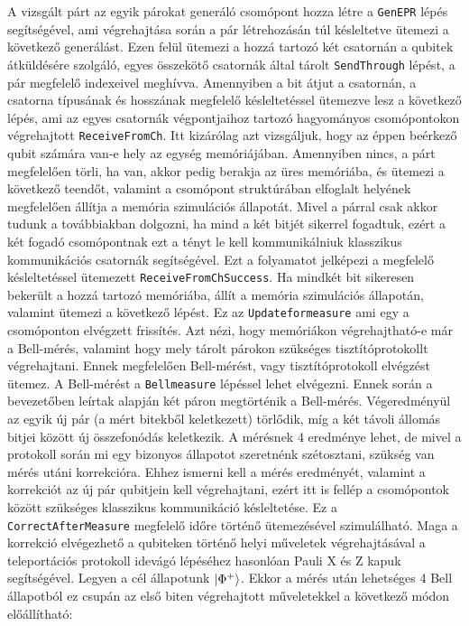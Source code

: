 A vizsgált párt az egyik párokat generáló csomópont hozza létre a \texttt{GenEPR} lépés segítségével, ami végrehajtása során a pár létrehozásán túl késleltetve ütemezi a következő generálást. Ezen felül ütemezi a hozzá tartozó két csatornán a qubitek átküldésére szolgáló, egyes összekötő csatornák által tárolt \texttt{SendThrough} lépést, a pár megfelelő indexeivel meghívva. Amennyiben a bit átjut a csatornán, a csatorna típusának és hosszának megfelelő késleltetéssel ütemezve lesz a következő lépés, ami az egyes csatornák végpontjaihoz tartozó hagyományos csomópontokon végrehajtott \texttt{ReceiveFromCh}. Itt kizárólag azt vizsgáljuk, hogy az éppen beérkező qubit számára van-e hely az egység memóriájában. Amennyiben nincs, a párt megfelelően törli, ha van, akkor pedig berakja az üres memóriába, és ütemezi a következő teendőt, valamint a csomópont struktúrában elfoglalt helyének megfelelően állítja a memória szimulációs állapotát.  Mivel a párral csak akkor tudunk a továbbiakban dolgozni, ha mind a két bitjét sikerrel fogadtuk, ezért a két fogadó csomópontnak ezt a tényt le kell kommunikálniuk klasszikus kommunikációs csatornák segítségével. Ezt a folyamatot jelképezi a megfelelő késleltetéssel ütemezett \texttt{ReceiveFromChSuccess}. Ha mindkét bit sikeresen bekerült a hozzá tartozó memóriába, állít a memória szimulációs állapotán, valamint ütemezi a következő lépést. Ez az \texttt{Updateformeasure} ami egy a csomóponton elvégzett frissítés. Azt nézi, hogy memóriákon végrehajtható-e már a Bell-mérés, valamint hogy mely tárolt párokon szükséges tisztítóprotokollt végrehajtani.
Ennek megfelelően Bell-mérést, vagy tisztítóprotokoll elvégzést ütemez. A Bell-mérést a \texttt{Bellmeasure} lépéssel lehet elvégezni. Ennek során a bevezetőben leírtak alapján két páron megtörténik a Bell-mérés. Végeredményül az egyik új pár (a mért bitekből keletkezett) törlődik, míg a két távoli állomás bitjei között új összefonódás keletkezik. A mérésnek 4 eredménye lehet, de mivel a protokoll során mi egy bizonyos állapotot szeretnénk szétosztani, szükség van mérés utáni korrekcióra. Ehhez ismerni kell a mérés eredményét, valamint a korrekciót az új pár qubitjein kell végrehajtani, ezért itt is fellép a csomópontok között szükséges klasszikus kommunikáció késleltetése. Ez a \texttt{CorrectAfterMeasure} megfelelő időre történő ütemezésével szimulálható. Maga a korrekció elvégezhető a qubiteken történő helyi műveletek végrehajtásával a teleportációs protokoll \cite{bennett1993teleporting} idevágó lépéséhez hasonlóan  Pauli X és Z kapuk segítségével. Legyen a cél állapotunk $\ket{\Phi^+}$. Ekkor a mérés után lehetséges 4 Bell állapotból ez csupán az első biten végrehajtott műveletekkel a következő módon előállítható:
